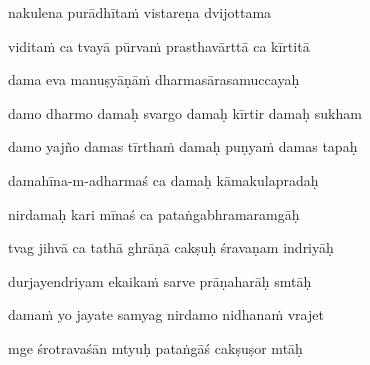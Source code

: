 nakulena purādhītaṁ vistareṇa dvijottama\thinspace{\dandab} \dontdisplaylinenum

viditaṁ ca tvayā pūrvaṁ prasthavārttā ca kīrtitā \veg\dontdisplaylinenum



dama eva manuṣyāṇāṁ dharmasārasamuccayaḥ\thinspace{\dandab} \dontdisplaylinenum

damo dharmo damaḥ svargo damaḥ kīrtir damaḥ sukham \veg\dontdisplaylinenum
{}

damo yajño damas tīrthaṁ damaḥ puṇyaṁ damas tapaḥ\thinspace{\dandab} \dontdisplaylinenum

damahīna-m-adharmaś ca damaḥ kāmakulapradaḥ \veg\dontdisplaylinenum
{}

nirdamaḥ kari mīnaś ca pataṅgabhramaramgāḥ\thinspace{\dandab} \dontdisplaylinenum

tvag jihvā ca tathā ghrāṇā cakṣuḥ śravaṇam indriyāḥ \veg\dontdisplaylinenum
{}

durjayendriyam ekaikaṁ sarve prāṇaharāḥ smtāḥ\thinspace{\dandab} \dontdisplaylinenum

damaṁ yo jayate samyag nirdamo nidhanaṁ vrajet \veg\dontdisplaylinenum
{}

mge śrotravaśān mtyuḥ pataṅgāś cakṣuṣor mtāḥ\thinspace{\dandab} \dontdisplaylinenum

